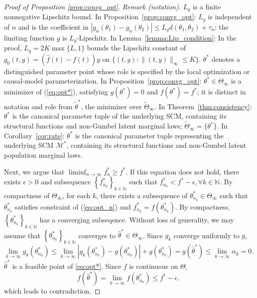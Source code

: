 \begin{proof}[Proof of Proposition \ref{prop:convg_opt}]
\noindent\textit{Remark (notation).} $L_g$ is a finite nonnegative Lipschitz bound. In Proposition~\ref{prop:convg_opt}: $L_g$ is independent of $n$ and is the coefficient in $|g_n(\theta_1)-g_n(\theta_2)|\leqslant L_g d(\theta_1,\theta_2)+\tau_n$; the limiting function $g$ is $L_g$-Lipschitz. In Lemma~\ref{lemma:Lip_condition}: In the proof, $L_g=2K\max\{L,1\}$ bounds the Lipschitz constant of $g_0(t,y)=(\hat f(t)-f(t))y$ on $\{(t,y):\|(t,y)\|_\infty\leqslant K\}$. $\theta^*$ denotes a distinguished parameter point whose role is specified by the local optimization or causal-model parameterization. In Proposition~\ref{prop:convg_opt}: $\theta^*\in\Theta_\infty$ is a minimizer of (\ref{eq:opt*}), satisfying $g(\theta^*)=0$ and $f(\theta^*)=f^*$; it is distinct in notation and role from $\tilde\theta^*$, the minimizer over $\tilde\Theta_\infty$. In Theorem~\ref{thm:consistency}: $\theta^*$ is the canonical parameter tuple of the underlying SCM, containing its structural functions and non-Gumbel latent marginal laws; $\tilde\Theta_\infty=\{\theta^*\}$. In Corollary~\ref{cor:rate}: $\theta^*$ is the canonical parameter tuple representing the underlying SCM $\mathcal M^*$, containing its structural functions and non-Gumbel latent population marginal laws.


Next, we argue that $ \liminf _{n\rightarrow \infty } f_{n}^{*} \geqslant f^{*}$. If this equation does not hold, there exists $\epsilon  >0$ and subsequence $\left\{f_{n_{k}}^{*}\right\}_{k\in \mathbb{N}}$ such that $f_{n_{k}}^{*} < f^{*} -\epsilon ,\forall k\in \mathbb{N}$. By compactness of $\Theta _{\infty }$, for each $ k$,  there exists a subsequence of $\theta _{n_{k}}^{*} \in \Theta _{\infty }$ such that $ \theta _{n_{k}}^{*}$ satisfies constraint of (\ref{eq:opt_n}) and $ f_{n_{k}}^{*} =f\left( \theta _{n_{k}}^{*}\right)$. By compactness, $\left\{\theta _{n_{k}}^{*}\right\}_{k\in \mathbb{N}}$ has a converging subseqence. Without loss of generality, we may assume that $\left\{\theta _{n_{k}}^{*}\right\}_{k\in \mathbb{N}}$ converges to $\hat{\theta }^{*} \in \Theta _{\infty }$. Since $g_{k}$ converge uniformly to $g$, 
\begin{equation*}
\lim _{k\rightarrow \infty } g_{k}\left( \theta _{n_{k}}^{*}\right) \leqslant \lim _{k\rightarrow \infty } |g_{k}\left( \theta _{n_{k}}^{*}\right) -g\left( \theta _{n_{k}}^{*}\right) |+g\left( \theta _{n_{k}}^{*}\right) =g\left(\hat{\theta }^{*}\right) \leqslant \lim _{k\rightarrow \infty } \alpha _{k} =0.
\end{equation*}
$\hat{\theta }^{*}$ is a feasible point of \cref{eq:opt*}. Since $f$ is continuous on $\Theta $,
\begin{equation*}
f\left(\hat{\theta }^{*}\right) =\lim _{k\rightarrow \infty } f\left( \theta _{n_{k}}^{*}\right) \leqslant f^{*} -\epsilon .
\end{equation*}
which leads to contradiction.
\end{proof}

